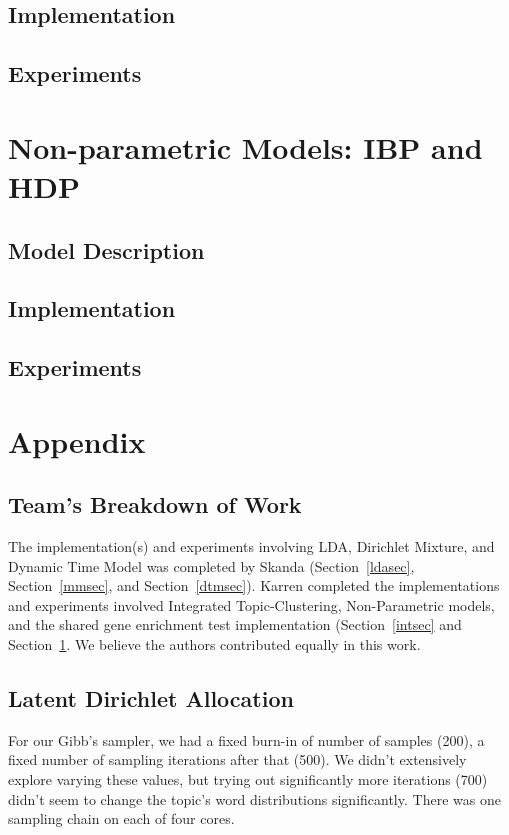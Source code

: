 \documentclass{article}
\begin{document}
\subsection{Implementation} 
\subsection{Experiments} 



\section{Non-parametric Models: IBP and HDP} 
\label{nonparametricsec}
\subsection{Model Description} 
\subsection{Implementation} 
\subsection{Experiments} 







\section{Appendix} 

\subsection{Team's Breakdown of Work}
The implementation(s) and experiments involving LDA, Dirichlet Mixture, and Dynamic Time Model was completed by Skanda (Section~\ref{ldasec}, Section~\ref{mmsec}, and Section~\ref{dtmsec}). Karren completed the implementations and experiments involved Integrated Topic-Clustering, Non-Parametric models, and the shared gene enrichment test implementation (Section~\ref{intsec} and Section~\ref{nonparametricsec}. We believe the authors contributed equally in this work.

\subsection{Latent Dirichlet Allocation}
\label{ldaappendix}
For our Gibb's sampler, we had a fixed burn-in of number of samples (200), a fixed number of sampling iterations after that (500). We didn't extensively explore varying these values, but trying out significantly more iterations (700) didn't seem to change the topic's word distributions significantly. There was one sampling chain on each of four cores.
\end{document}
